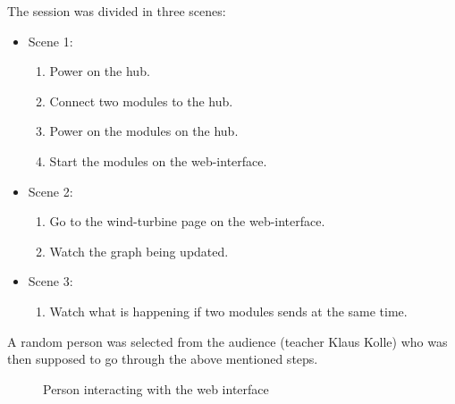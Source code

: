 The session was divided in three scenes:
\begin{itemize}
	\item Scene 1:
		\begin{enumerate}
			\item Power on the hub.
			\item Connect two modules to the hub.
			\item Power on the modules on the hub.
			\item Start the modules on the web-interface.
		\end{enumerate}
	\item Scene 2:
		\begin{enumerate}
			\item Go to the wind-turbine page on the web-interface.
			\item Watch the graph being updated.
		\end{enumerate}
	\item Scene 3:
		\begin{enumerate}
			\item Watch what is happening if two modules sends at the same time.
		\end{enumerate}
\end{itemize}

A random person was selected from the audience (teacher Klaus Kolle) who was then supposed to go through the above mentioned steps. 

\begin{figure}[H]
  \centering
  \hspace{0.2cm}                
  \caption{Person interacting with the web interface}
  \label{fig:drama_web}
\end{figure}

